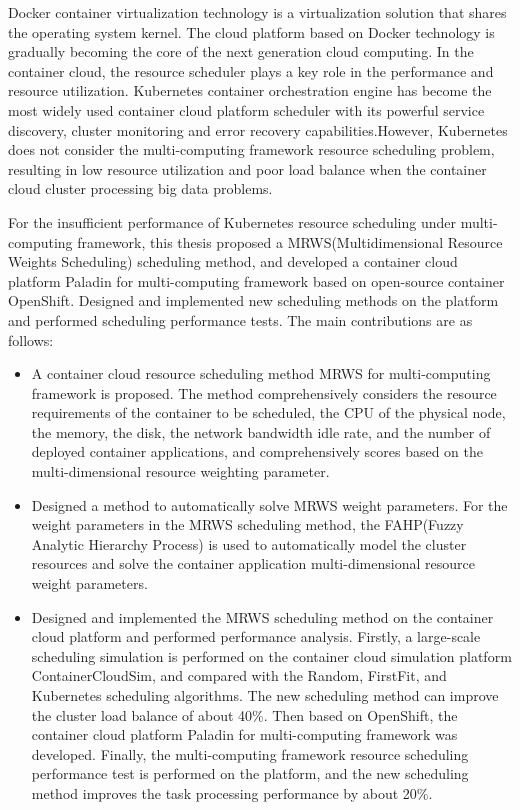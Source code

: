 \begin{eabstract}
Docker container virtualization technology is a virtualization solution that shares the operating system kernel. The cloud platform based on Docker technology is gradually becoming the core of the next generation cloud computing. In the container cloud, the resource scheduler plays a key role in the performance and resource utilization. Kubernetes container orchestration engine has become the most widely used container cloud platform scheduler with its powerful service discovery, cluster monitoring and error recovery capabilities.However, Kubernetes does not consider the multi-computing framework resource scheduling problem, resulting in low resource utilization and poor load balance when the container cloud cluster processing big data problems.

For the insufficient performance of Kubernetes resource scheduling under multi-computing framework, this thesis proposed a MRWS(Multidimensional Resource Weights Scheduling) scheduling method, and developed a container cloud platform Paladin for multi-computing framework based on open-source container OpenShift. Designed and implemented new scheduling methods on the platform and performed scheduling performance tests. The main contributions are as follows:

\begin{itemize}
	\item A container cloud resource scheduling method MRWS for multi-computing framework is proposed. The method comprehensively considers the resource requirements of the container to be scheduled, the CPU of the physical node, the memory, the disk, the network bandwidth idle rate, and the number of deployed container applications, and comprehensively scores based on the multi-dimensional resource weighting parameter.
	\item Designed a method to automatically solve MRWS weight parameters. For the weight parameters in the MRWS scheduling method, the FAHP(Fuzzy Analytic Hierarchy Process) is used to automatically model the cluster resources and solve the container application multi-dimensional resource weight parameters.
	\item Designed and implemented the MRWS scheduling method on the container cloud platform and performed performance analysis. Firstly, a large-scale scheduling simulation is performed on the container cloud simulation platform ContainerCloudSim, and compared with the Random, FirstFit, and Kubernetes scheduling algorithms. The new scheduling method can improve the cluster load balance of about 40\%. Then based on OpenShift, the container cloud platform Paladin for multi-computing framework was developed. Finally, the multi-computing framework resource scheduling performance test is performed on the platform, and the new scheduling method improves the task processing performance by about 20\%.
\end{itemize}
\end{eabstract}











